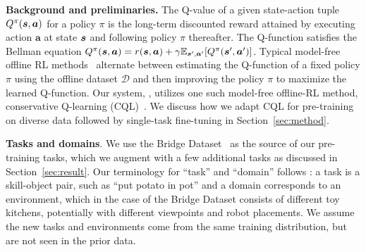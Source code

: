 \textbf{Background and preliminaries.} The Q-value of a given state-action tuple $Q^\pi(\boldsymbol{s}, \boldsymbol{a})$ for a policy $\pi$ is the long-term discounted reward attained by executing action $\mathbf{a}$ at state $\boldsymbol{s}$ and following policy $\pi$ thereafter. The Q-function satisfies the Bellman equation $Q^\pi(\boldsymbol{s}, \boldsymbol{a}) = r(\boldsymbol{s}, \boldsymbol{a}) + \gamma \mathbb{E}_{\boldsymbol{s}', \boldsymbol{a}'}[Q^\pi(\boldsymbol{s}', \boldsymbol{a}')]$. Typical model-free offline RL methods~\citep{fujimoto2018off,kumar2019stabilizing,kumar2020conservative} alternate between estimating the Q-function of a fixed policy $\pi$ using the offline dataset $\mathcal{D}$ and then improving the policy $\pi$ to maximize the learned Q-function. Our system, \ptrmethodname, utilizes one such model-free offline-RL method, conservative Q-learning (CQL)~\citep{kumar2020conservative}. We discuss how we adapt CQL for pre-training on diverse data followed by single-task fine-tuning in Section~\ref{sec:method}.

\textbf{Tasks and domains}. We use the Bridge Dataset~\cite{ebert2021bridge} as the source of our pre-training tasks, which we augment with a few additional tasks as discussed in Section~\ref{sec:result}. Our terminology for ``task'' and ``domain'' follows \citet{ebert2021bridge}: a task is a skill-object pair, such as ``put potato in pot'' and a domain corresponds to an environment, which in the case of the Bridge Dataset consists of different toy kitchens, potentially with different viewpoints and robot placements. We assume the new tasks and environments come from the same training distribution, but are not seen in the prior data.